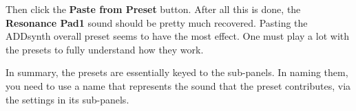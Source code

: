    Then click the \textbf{Paste from Preset} button.
   After all this is done, the
   \textbf{Resonance Pad1} sound should 
   be pretty much recovered.
   Pasting the ADDsynth overall preset seems to have the most effect.
   One must play a lot with the presets to fully understand how they work.

   In summary, the presets are essentially keyed to the sub-panels.
   In naming them, you need to use a name that represents the sound that the
   preset contributes, via the settings in its sub-panels.

